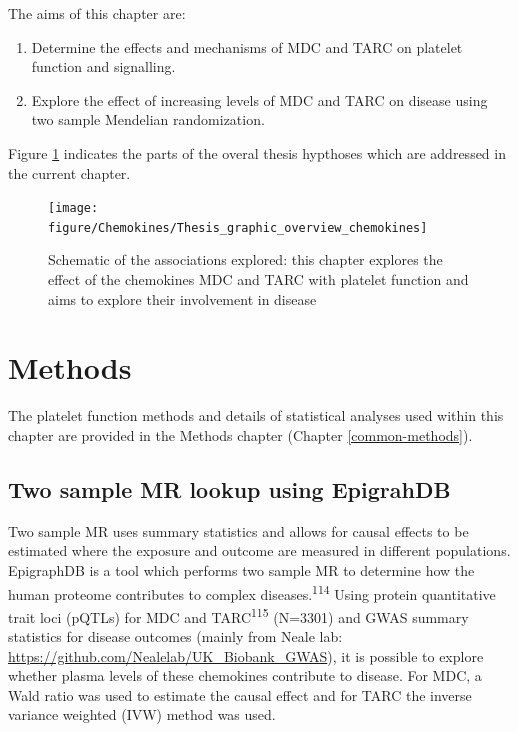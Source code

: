 \documentclass[11pt,twoside]{bristolthesis}
\providecommand{\tightlist}{%
  \setlength{\itemsep}{0pt}\setlength{\parskip}{0pt}}
\begin{document}
The aims of this chapter are:
\begin{enumerate}
\def\labelenumi{\arabic{enumi})}
\tightlist
\item
  Determine the effects and mechanisms of MDC and TARC on platelet function and signalling.
\item
  Explore the effect of increasing levels of MDC and TARC on disease using two sample Mendelian randomization.
\end{enumerate}
Figure \ref{fig:chemokine-platelet-graphic} indicates the parts of the overal thesis hypthoses which are addressed in the current chapter.
\begin{figure}
\texttt{[image: figure/Chemokines/Thesis\_graphic\_overview\_chemokines]} \caption[Schematic of the associations explored]{Schematic of the associations explored: this chapter explores the effect of the chemokines MDC and TARC with platelet function and aims to explore their involvement in disease}\label{fig:chemokine-platelet-graphic}
\end{figure}
\hypertarget{methods-2}{%
\section{Methods}\label{methods-2}}

The platelet function methods and details of statistical analyses used within this chapter are provided in the Methods chapter (Chapter \ref{common-methods}).

\hypertarget{two-sample-mr-lookup-using-epigrahdb}{%
\subsection{Two sample MR lookup using EpigrahDB}\label{two-sample-mr-lookup-using-epigrahdb}}

Two sample MR uses summary statistics and allows for causal effects to be estimated where the exposure and outcome are measured in different populations. EpigraphDB is a tool which performs two sample MR to determine how the human proteome contributes to complex diseases.\textsuperscript{114} Using protein quantitative trait loci (pQTLs) for MDC and TARC\textsuperscript{115} (N=3301) and GWAS summary statistics for disease outcomes (mainly from Neale lab: \url{https://github.com/Nealelab/UK_Biobank_GWAS}), it is possible to explore whether plasma levels of these chemokines contribute to disease. For MDC, a Wald ratio was used to estimate the causal effect and for TARC the inverse variance weighted (IVW) method was used.
\end{document}

